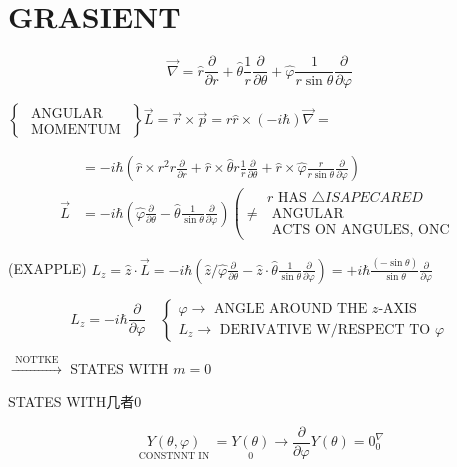 \documentclass[10pt]{article}
\begin{document}
\section*{GRASIENT}
$$
\vec{\nabla}=\hat{r} \frac{\partial}{\partial r}+\hat{\theta} \frac{1}{r} \frac{\partial}{\partial \theta}+\hat{\varphi} \frac{1}{r \sin \theta} \frac{\partial}{\partial \varphi}
$$

$\left\{\begin{array}{c}\text { ANGULAR } \\ \text { MOMENTUM }\end{array}\right\} \vec{L}=\vec{r} \times \vec{p}=r \hat{r} \times(-i \hbar) \vec{\nabla}=$

$$
\begin{aligned}
& =-i \hbar\left(\hat{r} \times r^{2} r \frac{\partial}{\partial r}+\hat{r} \times \hat{\theta} r \frac{1}{r} \frac{\partial}{\partial \theta}+\hat{r} \times \hat{\varphi} \frac{r}{r \sin \theta} \frac{\partial}{\partial \varphi}\right) \\
\vec{L} & =-i \hbar\left(\hat{\varphi} \frac{\partial}{\partial \theta}-\hat{\theta} \frac{1}{\sin \theta} \frac{\partial}{\partial \varphi}\right)\left(\neq \begin{array}{c}
r \text { HAS } \triangle I S A P E C A R E D \\
\text { ANGULAR } \\
\text { ACTS ON ANGULES, ONC }
\end{array}\right.
\end{aligned}
$$

(EXAPPLE) $L_{z}=\hat{z} \cdot \vec{L}=-i \hbar\left(\hat{z} / \hat{\varphi} \frac{\partial}{\partial \theta}-\hat{z} \cdot \hat{\theta} \frac{1}{\sin \theta} \frac{\partial}{\partial \varphi}\right)=+i \hbar \frac{(-\sin \theta)}{\sin \theta} \frac{\partial}{\partial \varphi}$

$$
L_{z}=-i \hbar \frac{\partial}{\partial \varphi} \quad\left\{\begin{array}{l}
\varphi \rightarrow \text { ANGLE AROUND THE } z \text {-AXIS } \\
L_{z} \rightarrow \text { DERIVATIVE W/RESPECT TO } \varphi
\end{array}\right.
$$

$\xrightarrow{\text { NOTTKE }}$ STATES WITH $m=0$

STATES WITH几者0

$$
\underset{\text { CONSTNNT IN }}{Y(\theta, \varphi)}=\underset{0}{Y(\theta)} \rightarrow \frac{\partial}{\partial \varphi} Y(\theta)=0_{0}^{\nabla}
$$
\end{document}
